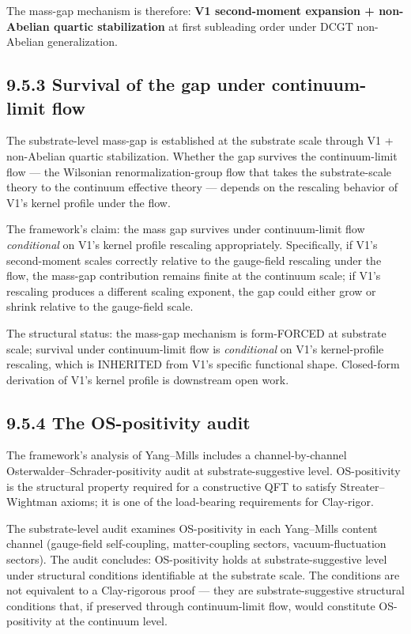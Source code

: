 \documentclass[11pt]{book}
\begin{document}
The mass-gap mechanism is therefore: \textbf{V1 second-moment expansion + non-Abelian quartic stabilization} at first subleading order under DCGT non-Abelian generalization.

\subsection{9.5.3 Survival of the gap under continuum-limit flow}

The substrate-level mass-gap is established at the substrate scale through V1 + non-Abelian quartic stabilization. Whether the gap survives the continuum-limit flow — the Wilsonian renormalization-group flow that takes the substrate-scale theory to the continuum effective theory — depends on the rescaling behavior of V1's kernel profile under the flow.

The framework's claim: the mass gap survives under continuum-limit flow \textit{conditional} on V1's kernel profile rescaling appropriately. Specifically, if V1's second-moment scales correctly relative to the gauge-field rescaling under the flow, the mass-gap contribution remains finite at the continuum scale; if V1's rescaling produces a different scaling exponent, the gap could either grow or shrink relative to the gauge-field scale.

The structural status: the mass-gap mechanism is form-FORCED at substrate scale; survival under continuum-limit flow is \textit{conditional} on V1's kernel-profile rescaling, which is INHERITED from V1's specific functional shape. Closed-form derivation of V1's kernel profile is downstream open work.

\subsection{9.5.4 The OS-positivity audit}

The framework's analysis of Yang–Mills includes a channel-by-channel Osterwalder–Schrader-positivity audit at substrate-suggestive level. OS-positivity is the structural property required for a constructive QFT to satisfy Streater–Wightman axioms; it is one of the load-bearing requirements for Clay-rigor.

The substrate-level audit examines OS-positivity in each Yang–Mills content channel (gauge-field self-coupling, matter-coupling sectors, vacuum-fluctuation sectors). The audit concludes: OS-positivity holds at substrate-suggestive level under structural conditions identifiable at the substrate scale. The conditions are not equivalent to a Clay-rigorous proof — they are substrate-suggestive structural conditions that, if preserved through continuum-limit flow, would constitute OS-positivity at the continuum level.
\end{document}
